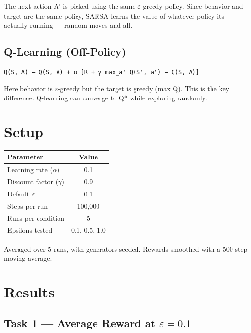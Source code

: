 \documentclass[11pt,a4paper]{article}
\begin{document}
The next action A' is picked using the same $\varepsilon$-greedy policy. Since behavior and target are the same policy, SARSA learns the value of whatever policy its actually running --- random moves and all.

\subsection{Q-Learning (Off-Policy)}

\begin{verbatim}
Q(S, A) ← Q(S, A) + α [R + γ max_a' Q(S', a') − Q(S, A)]
\end{verbatim}

Here behavior is $\varepsilon$-greedy but the target is greedy (max Q). This is the key difference: Q-learning can converge to Q* while exploring randomly.

\section{Setup}

\begin{table}[h]
\centering
\begin{tabular}{lc}
\toprule
Parameter & Value \\
\midrule
Learning rate ($\alpha$) & 0.1 \\
Discount factor ($\gamma$) & 0.9 \\
Default $\varepsilon$ & 0.1 \\
Steps per run & 100,000 \\
Runs per condition & 5 \\
Epsilons tested & 0.1, 0.5, 1.0 \\
\bottomrule
\end{tabular}
\end{table}

Averaged over 5 runs, with generators seeded. Rewards smoothed with a 500-step moving average.

\section{Results}

\subsection{Task 1 --- Average Reward at $\varepsilon = 0.1$}
\end{document}
